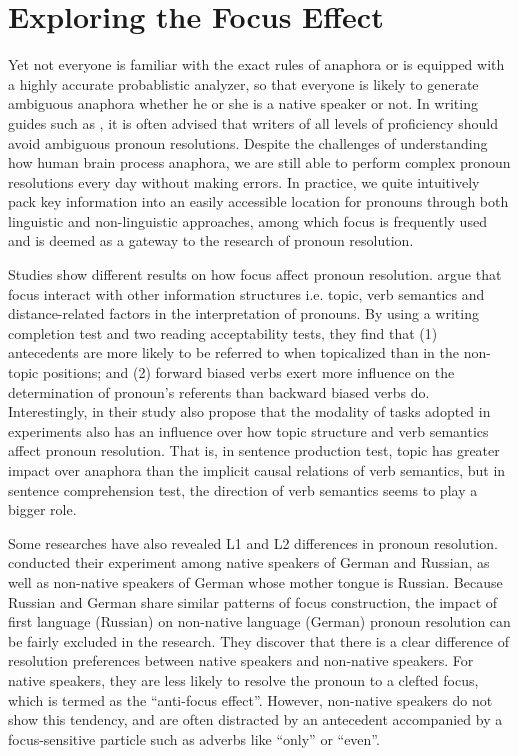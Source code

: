 \section{Exploring the Focus Effect}
Yet not everyone is familiar with the exact rules of anaphora or is equipped with a highly accurate probablistic analyzer, so that everyone is likely to generate ambiguous anaphora whether he or she is a native speaker or not. In writing guides such as \citet{pinker2014}, it is often advised that writers of all levels of proficiency should avoid ambiguous pronoun resolutions. Despite the challenges of understanding how human brain process anaphora, we are still able to perform complex pronoun resolutions every day without making errors. In practice, we quite intuitively pack key information into an easily accessible location for pronouns through both linguistic and non-linguistic approaches, among which focus is frequently used and is deemed as a gateway to the research of pronoun resolution.

Studies show different results on how focus affect pronoun resolution. \citet{徐晓东2013} argue that focus interact with other information structures i.e. topic, verb semantics and distance-related factors in the interpretation of pronouns. By using a writing completion test and two reading acceptability tests, they find that (1) antecedents are more likely to be referred to when topicalized than in the non-topic positions; and (2) forward biased verbs exert more influence on the determination of pronoun's referents than backward biased verbs do. Interestingly, \citet{徐晓东2013} in their study also propose that the modality of tasks adopted in experiments also has an influence over how topic structure and verb semantics affect pronoun resolution. That is, in sentence production test, topic has greater impact over anaphora than the implicit causal relations of verb semantics, but in sentence comprehension test, the direction of verb semantics seems to play a bigger role.

Some researches have also revealed L1 and L2 differences in pronoun resolution. \citet{patterson2017} conducted their experiment among native speakers of German and Russian, as well as non-native speakers of German whose mother tongue is Russian. Because Russian and German share similar patterns of focus construction, the impact of first language (Russian) on non-native language (German) pronoun resolution can be fairly excluded in the research. They discover that there is a clear difference of resolution preferences between native speakers and non-native speakers. For native speakers, they are less likely to resolve the pronoun to a clefted focus, which is termed as the “anti-focus effect”. However, non-native speakers do not show this tendency, and are often distracted by an antecedent accompanied by a focus-sensitive particle such as adverbs like “only” or “even”.

